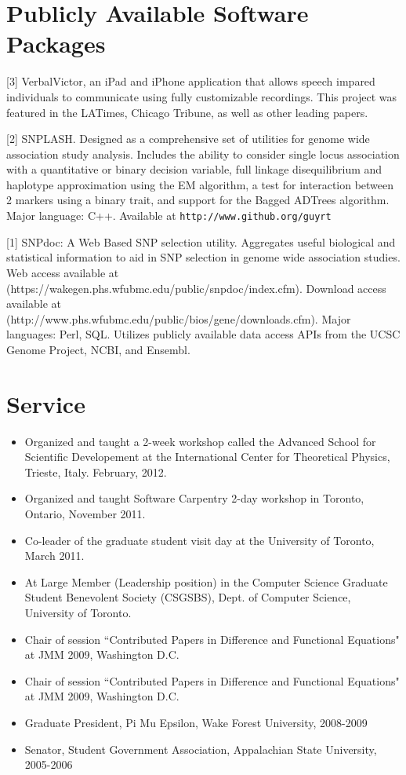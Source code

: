 \documentclass[overlapped,line,letterpaper]{res}
\begin{document}
\begin{resume}

\section{\bf Publicly Available Software Packages}

[3] VerbalVictor, an iPad and iPhone application that allows speech impared individuals to communicate using fully customizable recordings.  This project was featured in the LATimes, Chicago Tribune, as well as other leading papers.

[2] SNPLASH.  Designed as a comprehensive set of utilities for genome wide association study analysis.  Includes the ability to consider single locus association with a quantitative or binary decision variable, full linkage disequilibrium and haplotype approximation using the EM algorithm, a test for interaction between 2 markers using a binary trait, and support for the Bagged ADTrees algorithm.  Major language: C++. Available at \tt{http://www.github.org/guyrt} 

[1] SNPdoc: A Web Based SNP selection utility.  Aggregates useful biological and statistical information to aid in SNP selection in genome wide association studies.  Web access available at (https://wakegen.phs.wfubmc.edu/public/snpdoc/index.cfm).  Download access available at \\ (http://www.phs.wfubmc.edu/public/bios/gene/downloads.cfm).  Major languages: Perl, SQL. Utilizes publicly available data access APIs from the UCSC Genome Project, NCBI, and Ensembl.

\section{\bf Service}

\begin{itemize}
\item Organized and taught a 2-week workshop called the Advanced School for Scientific Developement at the International Center for Theoretical Physics, Trieste, Italy. February, 2012.
\item Organized and taught Software Carpentry 2-day workshop in Toronto, Ontario, November 2011.
\item Co-leader of the graduate student visit day at the University of Toronto, March 2011. 
\item At Large Member (Leadership position) in the Computer Science Graduate Student Benevolent Society (CSGSBS), Dept. of Computer Science, University of Toronto.
\item Chair of session ``Contributed Papers in Difference and Functional Equations" at JMM 2009, Washington D.C.
\item Chair of session ``Contributed Papers in Difference and Functional Equations" at JMM 2009, Washington D.C.
\item Graduate President, Pi Mu Epsilon, Wake Forest University, 2008-2009
\item Senator, Student Government Association, Appalachian State University, 2005-2006
\end{itemize}


\end{resume}
\end{document}
